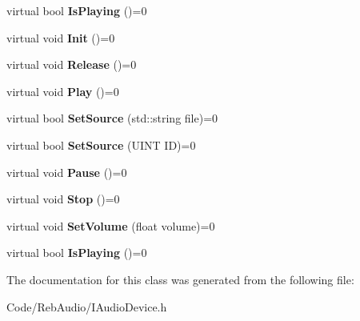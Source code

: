 \begin{DoxyCompactItemize}
\item 
virtual bool {\bfseries Is\+Playing} ()=0\hypertarget{class_i_music_player_a6fbae6f26758c70db531cb3a4312c703}{}\label{class_i_music_player_a6fbae6f26758c70db531cb3a4312c703}

\item 
virtual void {\bfseries Init} ()=0\hypertarget{class_i_music_player_a695e6d7ff2dcb18519ef62802cfd20a8}{}\label{class_i_music_player_a695e6d7ff2dcb18519ef62802cfd20a8}

\item 
virtual void {\bfseries Release} ()=0\hypertarget{class_i_music_player_a83f80991f61467a1bb9e7638a91132b3}{}\label{class_i_music_player_a83f80991f61467a1bb9e7638a91132b3}

\item 
virtual void {\bfseries Play} ()=0\hypertarget{class_i_music_player_a2bb20e18b2124e3466bc483addafc8ad}{}\label{class_i_music_player_a2bb20e18b2124e3466bc483addafc8ad}

\item 
virtual bool {\bfseries Set\+Source} (std\+::string file)=0\hypertarget{class_i_music_player_a4fb663480af59b9583635d8889af3f6e}{}\label{class_i_music_player_a4fb663480af59b9583635d8889af3f6e}

\item 
virtual bool {\bfseries Set\+Source} (U\+I\+NT ID)=0\hypertarget{class_i_music_player_af0b438570293b67772c83bf2d86f13b5}{}\label{class_i_music_player_af0b438570293b67772c83bf2d86f13b5}

\item 
virtual void {\bfseries Pause} ()=0\hypertarget{class_i_music_player_a43ca2033b85046541315c3387f3c58eb}{}\label{class_i_music_player_a43ca2033b85046541315c3387f3c58eb}

\item 
virtual void {\bfseries Stop} ()=0\hypertarget{class_i_music_player_ac947647ce3097ca49257cd099852b964}{}\label{class_i_music_player_ac947647ce3097ca49257cd099852b964}

\item 
virtual void {\bfseries Set\+Volume} (float volume)=0\hypertarget{class_i_music_player_aed424daf271bb9d6675fc8c80357d964}{}\label{class_i_music_player_aed424daf271bb9d6675fc8c80357d964}

\item 
virtual bool {\bfseries Is\+Playing} ()=0\hypertarget{class_i_music_player_a6fbae6f26758c70db531cb3a4312c703}{}\label{class_i_music_player_a6fbae6f26758c70db531cb3a4312c703}

\end{DoxyCompactItemize}


The documentation for this class was generated from the following file\+:\begin{DoxyCompactItemize}
\item 
Code/\+Reb\+Audio/I\+Audio\+Device.\+h\end{DoxyCompactItemize}

